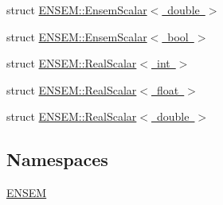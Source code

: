 \begin{DoxyCompactItemize}
struct \mbox{\hyperlink{structENSEM_1_1EnsemScalar_3_01double_01_4}{E\+N\+S\+E\+M\+::\+Ensem\+Scalar$<$ double $>$}}
\item 
struct \mbox{\hyperlink{structENSEM_1_1EnsemScalar_3_01bool_01_4}{E\+N\+S\+E\+M\+::\+Ensem\+Scalar$<$ bool $>$}}
\item 
struct \mbox{\hyperlink{structENSEM_1_1RealScalar_3_01int_01_4}{E\+N\+S\+E\+M\+::\+Real\+Scalar$<$ int $>$}}
\item 
struct \mbox{\hyperlink{structENSEM_1_1RealScalar_3_01float_01_4}{E\+N\+S\+E\+M\+::\+Real\+Scalar$<$ float $>$}}
\item 
struct \mbox{\hyperlink{structENSEM_1_1RealScalar_3_01double_01_4}{E\+N\+S\+E\+M\+::\+Real\+Scalar$<$ double $>$}}
\end{DoxyCompactItemize}
\subsection*{Namespaces}
\begin{DoxyCompactItemize}
\item 
 \mbox{\hyperlink{namespaceENSEM}{E\+N\+S\+EM}}
\end{DoxyCompactItemize}
